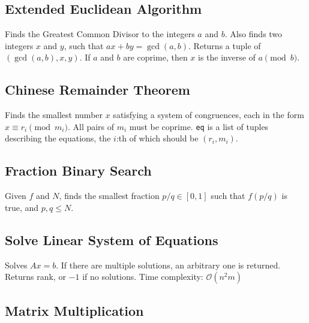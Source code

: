 \documentclass{article}
\begin{document}
\subsection*{Extended Euclidean Algorithm}
Finds the Greatest Common Divisor to the integers $a$ and $b$. Also finds two integers $x$ and $y$, such that $ax+by=\gcd(a,b)$.
Returns a tuple of $(\gcd(a, b), x, y)$. If $a$ and $b$ are coprime, then $x$ is the inverse of $a \pmod{b}$.
\begin{multicols}{2}
  
  \columnbreak
  
\end{multicols}

\subsection*{Chinese Remainder Theorem}
Finds the smallest number $x$ satisfying a system of congruences, each in the form $x \equiv r_i \pmod{m_i}$.
All pairs of $m_i$ must be coprime. \lstinline{eq} is a list of tuples describing the equations, the $i$:th of which should be $(r_i, m_i)$.
\begin{multicols}{2}
  
  \columnbreak
  
\end{multicols}

\subsection*{Fraction Binary Search}
Given $f$ and $N$, finds the smallest fraction $p/q \in [0, 1]$ such that $f(p/q)$ is true, and $p, q \le N$.


\subsection*{Solve Linear System of Equations}
Solves $A x = b$. If there are multiple solutions, an arbitrary one is returned.
Returns rank, or $-1$ if no solutions. Time complexity: $\mathcal{O}(n^2 m)$


\newpage

\subsection*{Matrix Multiplication}

\end{document}
